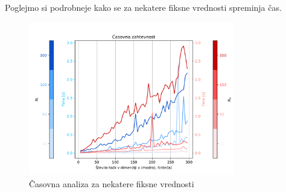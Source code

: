 Poglejmo si podrobneje kako se za nekatere fiksne vrednosti spreminja čas.
\begin{figure}[h]
    \centering
    \includegraphics[width=0.8\textwidth]{pdf/time1.pdf}
    \caption{Časovna analiza za nekatere fiksne vrednosti}
\end{figure}

